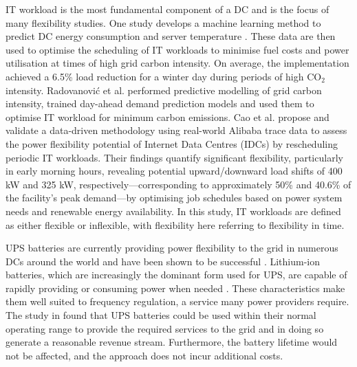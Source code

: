 \documentclass[lettersize,journal]{IEEEtran}
\begin{document}
IT workload is the most fundamental component of a DC and is the focus of many flexibility studies. One study develops a machine learning method to predict DC energy consumption and server temperature \cite{Misaghian2023TIA}. These data are then used to optimise the scheduling of IT workloads to minimise fuel costs and power utilisation at times of high grid carbon intensity. On average, the implementation achieved a 6.5\% load reduction for a winter day during periods of high CO$_2$ intensity. Radovanović et al. \cite{radovanovic2022carbon} performed predictive modelling of grid carbon intensity, trained day-ahead demand prediction models and used them to optimise IT workload for minimum carbon emissions.
Cao et al. \cite{Cao2022ApEn} propose and validate a data-driven methodology using real-world Alibaba trace data to assess the power flexibility potential of Internet Data Centres (IDCs) by rescheduling periodic IT workloads. Their findings quantify significant flexibility, particularly in early morning hours, revealing potential upward/downward load shifts of 400 kW and 325 kW, respectively—corresponding to approximately 50\% and 40.6\% of the facility's peak demand—by optimising job schedules based on power system needs and renewable energy availability. In this study, IT workloads are defined as either flexible or inflexible, with flexibility here referring to flexibility in time.

UPS batteries are currently providing power flexibility to the grid in numerous DCs around the world and have been shown to be successful \cite{alapera2019fast,roach2022microsoft,Anghel_2023}. Lithium-ion batteries, which are increasingly the dominant form used for UPS, are capable of rapidly providing or consuming power when needed \cite{alapera2018data}. These characteristics make them well suited to frequency regulation, a service many power providers require. The study in \cite{alapera2018data} found that UPS batteries could be used within their normal operating range to provide the required services to the grid and in doing so generate a reasonable revenue stream. Furthermore, the battery lifetime would not be affected, and the approach does not incur additional costs.
\end{document}
